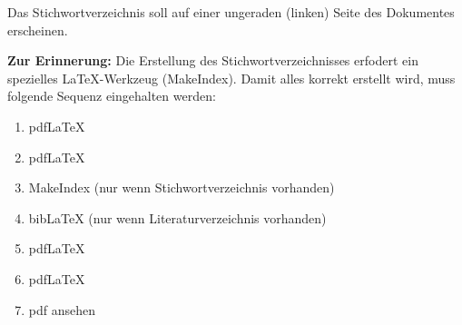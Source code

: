 
Das Stichwortverzeichnis soll auf einer ungeraden (linken) Seite des Dokumentes erscheinen.

\textbf{Zur Erinnerung:} Die Erstellung des Stichwortverzeichnisses erfodert ein spezielles \LaTeX-Werkzeug (MakeIndex). Damit alles korrekt erstellt wird, muss folgende Sequenz eingehalten werden:

\begin{enumerate}
\setlength\itemsep{-1em}
\item pdfLaTeX
\item pdfLaTeX
\item MakeIndex (nur wenn Stichwortverzeichnis vorhanden)
\item bibLaTeX (nur wenn Literaturverzeichnis vorhanden)
\item pdfLaTeX
\item pdfLaTeX
\item pdf ansehen
\end{enumerate}
